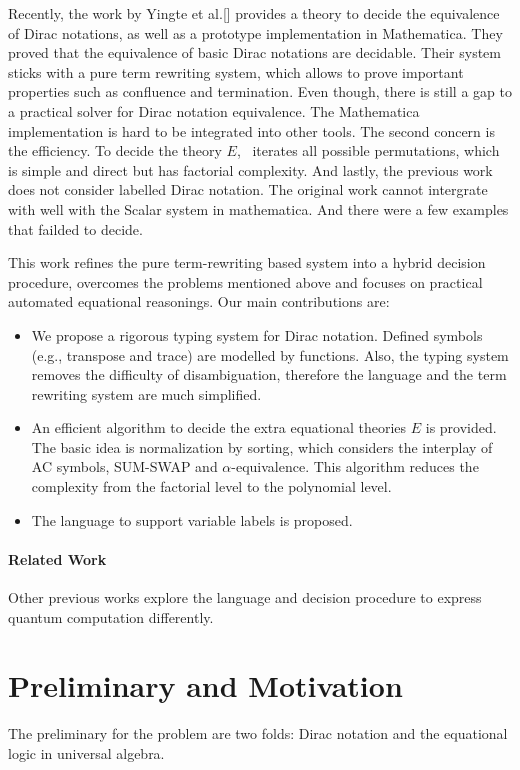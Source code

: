 \documentclass[runningheads]{llncs}
\begin{document}
Recently, the work by Yingte et al.[] provides a theory to decide the equivalence of Dirac notations, as well as a prototype implementation in Mathematica.
They proved that the equivalence of basic Dirac notations are decidable.
Their system sticks with a pure term rewriting system, which allows to prove important properties such as confluence and termination.
Even though, there is still a gap to a practical solver for Dirac notation equivalence.
The Mathematica implementation is hard to be integrated into other tools. 
The second concern is the efficiency. To decide the theory $E$, \DiracDec\ iterates all possible permutations, which is simple and direct but has factorial complexity.
And lastly, the previous work does not consider labelled Dirac notation.
The original work cannot intergrate with well with the Scalar system in mathematica.
And there were a few examples that failded to decide.





This work refines the pure term-rewriting based system into a hybrid decision procedure,
overcomes the problems mentioned above and focuses on practical
automated equational reasonings. Our main contributions are:
\begin{itemize}
    \item We propose a rigorous typing system for Dirac notation. Defined symbols (e.g., transpose and trace) are modelled by functions.
        Also, the typing system removes the difficulty of disambiguation, therefore the language and the term rewriting system are much simplified.
    \item An efficient algorithm to decide the extra equational theories $E$ is provided. The basic idea is normalization by sorting, which considers the interplay of AC symbols, SUM-SWAP and $\alpha$-equivalence. This algorithm reduces the complexity from the factorial level to the polynomial level.
    \item The language to support variable labels is proposed.
\end{itemize}

\paragraph{Related Work} Other previous works explore the language and decision procedure to express quantum computation differently.





\section{Preliminary and Motivation}
The preliminary for the problem are two folds: Dirac notation and the equational logic in universal algebra.
\end{document}

